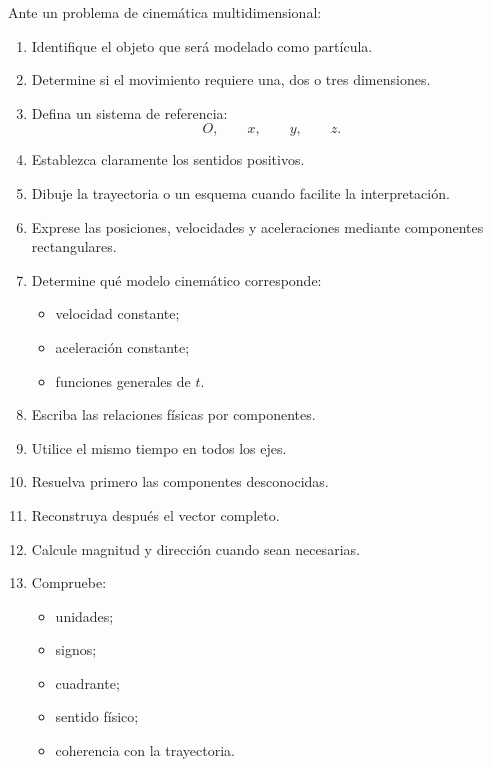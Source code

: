 \begin{estrategia}
Ante un problema de cinemática multidimensional:

\begin{enumerate}
    \item Identifique el objeto que será modelado como partícula.

    \item Determine si el movimiento requiere una, dos o tres dimensiones.

    \item Defina un sistema de referencia:
    \[
    O,\qquad x,\qquad y,\qquad z.
    \]

    \item Establezca claramente los sentidos positivos.

    \item Dibuje la trayectoria o un esquema cuando facilite la interpretación.

    \item Exprese las posiciones, velocidades y aceleraciones mediante componentes
    rectangulares.

    \item Determine qué modelo cinemático corresponde:
    \begin{itemize}
        \item velocidad constante;
        \item aceleración constante;
        \item funciones generales de \(t\).
    \end{itemize}

    \item Escriba las relaciones físicas por componentes.

    \item Utilice el mismo tiempo en todos los ejes.

    \item Resuelva primero las componentes desconocidas.

    \item Reconstruya después el vector completo.

    \item Calcule magnitud y dirección cuando sean necesarias.

    \item Compruebe:
    \begin{itemize}
        \item unidades;
        \item signos;
        \item cuadrante;
        \item sentido físico;
        \item coherencia con la trayectoria.
    \end{itemize}
\end{enumerate}
\end{estrategia}


